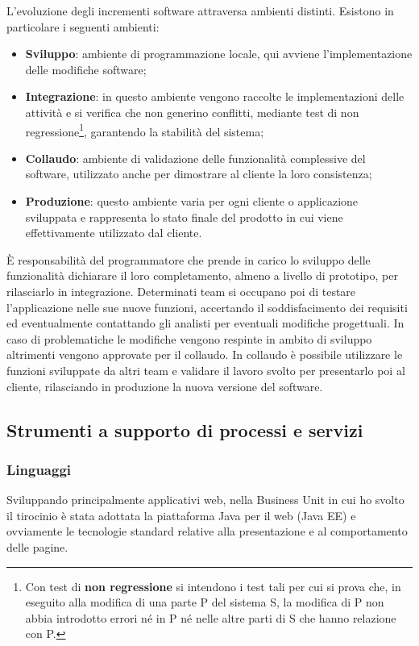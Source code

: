 	L'evoluzione degli incrementi software attraversa ambienti distinti.%
	Esistono in particolare i seguenti ambienti:
	\begin{itemize}
		\item \textbf{Sviluppo}: ambiente di programmazione locale, qui avviene l'implementazione delle modifiche software;
		\item \textbf{Integrazione}: in questo ambiente vengono raccolte le implementazioni delle attività e si verifica che non generino conflitti, mediante test di non regressione\footnote{Con test di \textbf{non regressione} si intendono i test tali per cui si prova che, in eseguito alla modifica di una parte P del sistema S, la modifica di P non abbia introdotto errori né in P né nelle altre parti di S che hanno relazione con P.}, garantendo la stabilità del sistema;
		\item \textbf{Collaudo}: ambiente di validazione delle funzionalità complessive del software, utilizzato anche per dimostrare al cliente la loro consistenza;
		\item \textbf{Produzione}: questo ambiente varia per ogni cliente o applicazione sviluppata e rappresenta lo stato finale del prodotto in cui viene effettivamente utilizzato dal cliente.
	\end{itemize}	
	
	È responsabilità del programmatore che prende in carico lo sviluppo delle funzionalità dichiarare il loro completamento, almeno a livello di prototipo, per rilasciarlo in integrazione. Determinati team si occupano poi di testare l'applicazione nelle sue nuove funzioni, accertando il soddisfacimento dei requisiti ed eventualmente contattando gli analisti per eventuali modifiche progettuali. In caso di problematiche le modifiche vengono respinte in ambito di sviluppo altrimenti vengono approvate per il collaudo. In collaudo è possibile utilizzare le funzioni sviluppate da altri team e validare il lavoro svolto per presentarlo poi al cliente, rilasciando in produzione la nuova versione del software.
	
	\subsection{Strumenti a supporto di processi e servizi}
	
	\subsubsection{Linguaggi}
	Sviluppando principalmente applicativi web, nella Business Unit in cui ho svolto il tirocinio è stata adottata la piattaforma Java per il web (Java EE) e ovviamente le tecnologie standard relative alla presentazione e al comportamento delle pagine.\\
	
